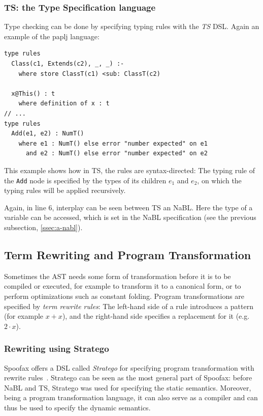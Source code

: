 \subsubsection{TS: the Type Specification language}
\label{ssec:a-orgheadline4}
Type checking can be done by specifying typing rules with the \emph{TS}
DSL. Again an example of the paplj language:
\lstset{language=type-spec,numbers=left}
\begin{lstlisting}
type rules
  Class(c1, Extends(c2), _, _) :-
    where store ClassT(c1) <sub: ClassT(c2)

  x@This() : t
    where definition of x : t
// ...
type rules
  Add(e1, e2) : NumT()
    where e1 : NumT() else error "number expected" on e1
      and e2 : NumT() else error "number expected" on e2
\end{lstlisting}
This example shows how in TS, the rules are syntax-directed: The
typing rule of the \texttt{Add} node is specified by the types of its
children \(e_1\) and \(e_2\), on which the typing rules will be applied
recursively.

Again, in line 6, interplay can be seen between TS an NaBL. Here the
type of a variable can be accessed, which is set in the NaBL
specification (see the previous subsection, \cref{ssec:a-nabl}).

\subsection{Term Rewriting and Program Transformation}
\label{ssec:a-term-rewrite}
Sometimes the AST needs some form of transformation before it is to be
compiled or executed, for example to transform it to a canonical form,
or to perform optimizations such as constant folding. Program
transformations are specified by \emph{term rewrite rules}: The left-hand
side of a rule introduces a pattern (for example \(x + x\)), and the
right-hand side specifies a replacement for it (e.g. \(2\cdot x\)).

\subsubsection{Rewriting using Stratego}
\label{ssec:a-orgheadline5}
Spoofax offers a DSL called \emph{Stratego} for specifying program
transformation with rewrite rules~\cite{Visser01}. Stratego can be
seen as the most general part of Spoofax: before NaBL and TS, Stratego
was used for specifying the static semantics. Moreover, being a
program transformation language, it can also serve as a compiler and
can thus be used to specify the dynamic semantics.

